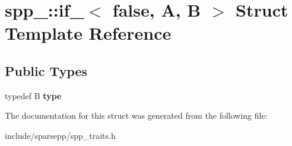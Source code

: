 \hypertarget{structspp___1_1if___3_01false_00_01_a_00_01_b_01_4}{}\section{spp\+\_\+\+:\+:if\+\_\+$<$ false, A, B $>$ Struct Template Reference}
\label{structspp___1_1if___3_01false_00_01_a_00_01_b_01_4}
\subsection*{Public Types}
\begin{DoxyCompactItemize}
\item 
typedef B {\bfseries type}\hypertarget{structspp___1_1if___3_01false_00_01_a_00_01_b_01_4_a6ba89a94fd39fc1574eef315c4e3eaf9}{}\label{structspp___1_1if___3_01false_00_01_a_00_01_b_01_4_a6ba89a94fd39fc1574eef315c4e3eaf9}

\end{DoxyCompactItemize}


The documentation for this struct was generated from the following file\+:\begin{DoxyCompactItemize}
\item 
include/sparsepp/spp\+\_\+traits.\+h\end{DoxyCompactItemize}
